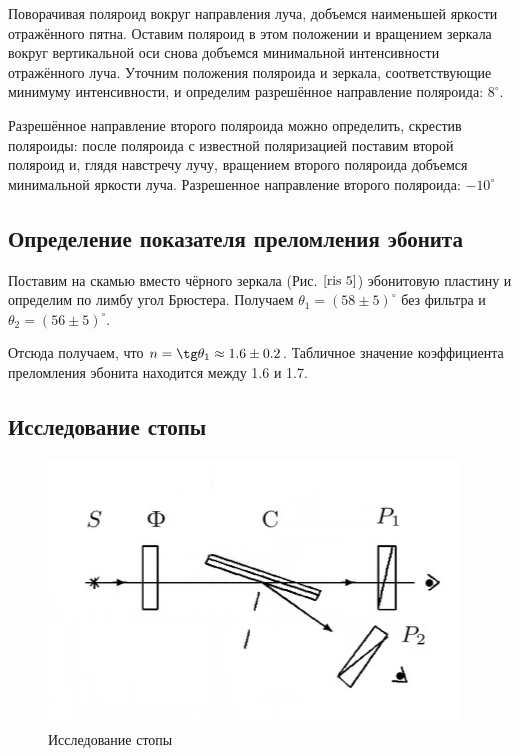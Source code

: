 \documentclass[a4paper, 12pt]{article}
\begin{document}
Поворачивая поляроид вокруг направления луча, добъемся наименьшей яркости отражённого пятна. Оставим поляроид в этом положении и вращением зеркала вокруг вертикальной оси снова добъемся минимальной интенсивности отражённого луча. Уточним положения поляроида
и зеркала, соответствующие минимуму интенсивности, и определим разрешённое направление поляроида: $8^\circ$.

Разрешённое направление второго поляроида можно определить, скрестив поляроиды: после поляроида с известной поляризацией поставим второй поляроид и, глядя навстречу лучу, вращением второго поляроида добъемся минимальной яркости луча. Разрешенное направление второго поляроида: $-10^\circ$

\subsection{Определение показателя преломления эбонита}

Поставим на скамью вместо чёрного зеркала (Рис. $\ref{ris 5}$) эбонитовую
пластину и определим по лимбу угол Брюстера. Получаем $ \theta_1 =(58 \pm 5) ^\circ$ без фильтра и $ \theta_2 =(56 \pm 5) ^\circ$. 

Отсюда получаем, что $ n = \tg \theta_1 \approx 1.6 \pm 0.2 $. Табличное значение коэффициента преломления эбонита находится между 1.6 и 1.7.

\subsection{Исследование стопы}

\begin{figure}
	\includegraphics[width=\linewidth]{6}
	\caption{Исследование стопы}
	\label{ris 6}
\end{figure}
\end{document}
